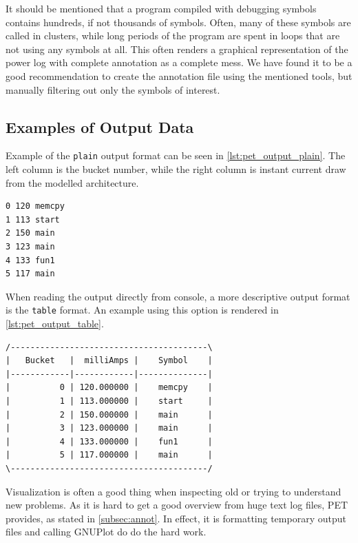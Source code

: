 

It should be mentioned that a program compiled with debugging symbols contains
hundreds, if not thousands of symbols. Often, many of these symbols are called
in clusters, while long periods of the program are spent in loops that are not
using any symbols at all. This often renders a graphical representation of the
power log with complete annotation as a complete mess. We have found it to be a
good recommendation to create the annotation file using the mentioned tools, but
manually filtering out only the symbols of interest.


\subsection{Examples of Output Data}

Example of the \texttt{plain} output format can be seen in
\autoref{lst:pet_output_plain}. The left column is the bucket number, while the
right column is instant current draw from the modelled architecture.

\begin{lstlisting}[float=hbt,label={lst:pet_output_plain},caption={PET Plain Output}]
0 120 memcpy
1 113 start
2 150 main
3 123 main
4 133 fun1
5 117 main
\end{lstlisting}

When reading the output directly from console, a more descriptive output format
is the \texttt{table} format. An example using this option is rendered in
\autoref{lst:pet_output_table}.

\begin{lstlisting}[float=hbt,label={lst:pet_output_table},caption={PET Table Output}]
/----------------------------------------\
|   Bucket   |  milliAmps |    Symbol    |
|------------|------------|--------------|
|          0 | 120.000000 |    memcpy    |
|          1 | 113.000000 |    start     |
|          2 | 150.000000 |    main      |
|          3 | 123.000000 |    main      |
|          4 | 133.000000 |    fun1      |
|          5 | 117.000000 |    main      |
\----------------------------------------/
\end{lstlisting}

Visualization is often a good thing when inspecting old or trying to understand
new problems. As it is hard to get a good overview from huge text log files, PET
provides, as stated in \autoref{subsec:annot}. In effect, it is formatting
temporary output files and calling GNUPlot do do the hard work.

